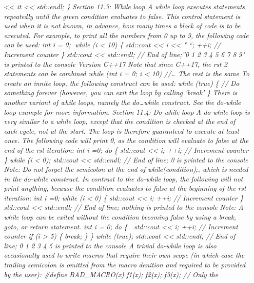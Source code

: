 \textless\textless{} \emph{it \textless\textless{} std::endl; \} Section
11.3: While loop A while loop executes statements repeatedly until the
given condition evaluates to false. This control statement is used when
it is not known, in advance, how many times a block of code is to be
executed. For example, to print all the numbers from 0 up to 9, the
following code can be used: int i = 0; while (i \textless{} 10) \{
std::cout \textless\textless{} i \textless\textless{} " ``; ++i; //
Increment counter \} std::cout \textless\textless{} std::endl; // End of
line;''0 1 2 3 4 5 6 7 8 9" is printed to the console Version C++17 Note
that since C++17, the rst 2 statements can be combined while (int i = 0;
i \textless{} 10) //\ldots{} The rest is the same To create an innite
loop, the following construct can be used: while (true) \{ // Do
something forever (however, you can exit the loop by calling `break' \}
There is another variant of while loops, namely the do\ldots while
construct. See the do-while loop example for more information. Section
11.4: Do-while loop A do-while loop is very similar to a while loop,
except that the condition is checked at the end of each cycle, not at
the start. The loop is therefore guaranteed to execute at least once.
The following code will print 0, as the condition will evaluate to false
at the end of the rst iteration: int i =0; do \{ std::cout
\textless\textless{} i; ++i; // Increment counter \} while (i
\textless{} 0); std::cout \textless\textless{} std::endl; // End of
line; 0 is printed to the console Note: Do not forget the semicolon at
the end of while(condition);, which is needed in the do-while construct.
In contrast to the do-while loop, the following will not print anything,
because the condition evaluates to false at the beginning of the rst
iteration: int i =0; while (i \textless{} 0) \{ std::cout
\textless\textless{} i; ++i; // Increment counter \}\\
std::cout \textless\textless{} std::endl; // End of line; nothing is
printed to the console Note: A while loop can be exited without the
condition becoming false by using a break, goto, or return statement.
int i = 0; do \{  std::cout \textless\textless{} i; ++i; // Increment
counter if (i \textgreater{} 5) \{ break; \} \} while (true); std::cout
\textless\textless{} std::endl; // End of line; 0 1 2 3 4 5 is printed
to the console A trivial do-while loop is also occasionally used to
write macros that require their own scope (in which case the trailing
semicolon is omitted from the macro denition and required to be provided
by the user): \#define BAD\_MACRO(x) f1(x); f2(x); f3(x); // Only the
}
